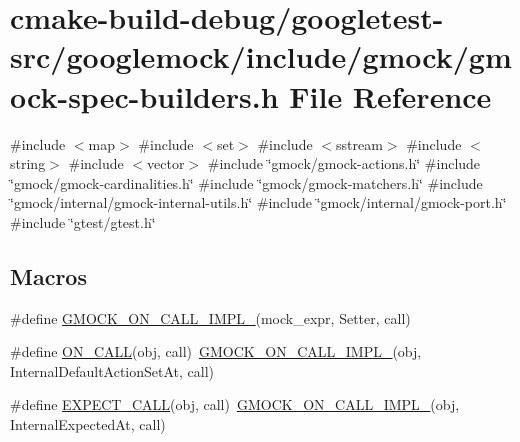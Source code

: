 \hypertarget{gmock-spec-builders_8h}{}\section{cmake-\/build-\/debug/googletest-\/src/googlemock/include/gmock/gmock-\/spec-\/builders.h File Reference}
\label{gmock-spec-builders_8h}
{\ttfamily \#include $<$map$>$}\newline
{\ttfamily \#include $<$set$>$}\newline
{\ttfamily \#include $<$sstream$>$}\newline
{\ttfamily \#include $<$string$>$}\newline
{\ttfamily \#include $<$vector$>$}\newline
{\ttfamily \#include \char`\"{}gmock/gmock-\/actions.\+h\char`\"{}}\newline
{\ttfamily \#include \char`\"{}gmock/gmock-\/cardinalities.\+h\char`\"{}}\newline
{\ttfamily \#include \char`\"{}gmock/gmock-\/matchers.\+h\char`\"{}}\newline
{\ttfamily \#include \char`\"{}gmock/internal/gmock-\/internal-\/utils.\+h\char`\"{}}\newline
{\ttfamily \#include \char`\"{}gmock/internal/gmock-\/port.\+h\char`\"{}}\newline
{\ttfamily \#include \char`\"{}gtest/gtest.\+h\char`\"{}}\newline
\subsection*{Macros}
\begin{DoxyCompactItemize}
\item 
\#define \mbox{\hyperlink{gmock-spec-builders_8h_a2de39c343f6d2cc6d52c7786968ea7cf}{G\+M\+O\+C\+K\+\_\+\+O\+N\+\_\+\+C\+A\+L\+L\+\_\+\+I\+M\+P\+L\+\_\+}}(mock\+\_\+expr,  Setter,  call)
\item 
\#define \mbox{\hyperlink{gmock-spec-builders_8h_a5b12ae6cf84f0a544ca811b380c37334}{O\+N\+\_\+\+C\+A\+LL}}(obj,  call)~\mbox{\hyperlink{gmock-spec-builders_8h_a2de39c343f6d2cc6d52c7786968ea7cf}{G\+M\+O\+C\+K\+\_\+\+O\+N\+\_\+\+C\+A\+L\+L\+\_\+\+I\+M\+P\+L\+\_\+}}(obj, Internal\+Default\+Action\+Set\+At, call)
\item 
\#define \mbox{\hyperlink{gmock-spec-builders_8h_a535a6156de72c1a2e25a127e38ee5232}{E\+X\+P\+E\+C\+T\+\_\+\+C\+A\+LL}}(obj,  call)~\mbox{\hyperlink{gmock-spec-builders_8h_a2de39c343f6d2cc6d52c7786968ea7cf}{G\+M\+O\+C\+K\+\_\+\+O\+N\+\_\+\+C\+A\+L\+L\+\_\+\+I\+M\+P\+L\+\_\+}}(obj, Internal\+Expected\+At, call)
\end{DoxyCompactItemize}
